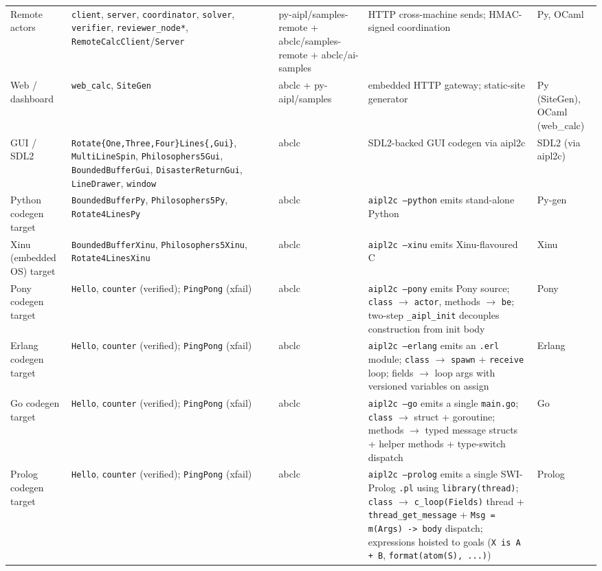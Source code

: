 \documentclass[10pt,a4paper,landscape]{article}
\begin{document}
\begin{longtable}{p{3.0cm} p{5.5cm} p{2.8cm} p{6.4cm} p{4.0cm}}
  Remote actors & \texttt{client}, \texttt{server}, \texttt{coordinator}, \texttt{solver}, \texttt{verifier}, \texttt{reviewer\_node*}, \texttt{RemoteCalcClient}/\texttt{Server} & py-aipl/samples-remote + abclc/samples-remote + abclc/ai-samples & HTTP cross-machine sends; HMAC-signed coordination & Py, OCaml \\
  Web / dashboard & \texttt{web\_calc}, \texttt{SiteGen} & abclc + py-aipl/samples & embedded HTTP gateway; static-site generator & Py (SiteGen), OCaml (web\_calc) \\
  GUI / SDL2 & \texttt{Rotate\{One,Three,Four\}Lines\{,Gui\}}, \texttt{MultiLineSpin}, \texttt{Philosophers5Gui}, \texttt{BoundedBufferGui}, \texttt{DisasterReturnGui}, \texttt{LineDrawer}, \texttt{window} & abclc & SDL2-backed GUI codegen via aipl2c & SDL2 (via aipl2c) \\
  Python codegen target & \texttt{BoundedBufferPy}, \texttt{Philosophers5Py}, \texttt{Rotate4LinesPy} & abclc & \texttt{aipl2c --python} emits stand-alone Python & Py-gen \\
  Xinu (embedded OS) target & \texttt{BoundedBufferXinu}, \texttt{Philosophers5Xinu}, \texttt{Rotate4LinesXinu} & abclc & \texttt{aipl2c --xinu} emits Xinu-flavoured C & Xinu \\
  Pony codegen target & \texttt{Hello}, \texttt{counter} (verified); \texttt{PingPong} (xfail) & abclc & \texttt{aipl2c --pony} emits Pony source; \texttt{class} $\to$ \texttt{actor}, methods $\to$ \texttt{be}; two-step \texttt{\_aipl\_init} decouples construction from init body & Pony \\
  Erlang codegen target & \texttt{Hello}, \texttt{counter} (verified); \texttt{PingPong} (xfail) & abclc & \texttt{aipl2c --erlang} emits an \texttt{.erl} module; \texttt{class} $\to$ \texttt{spawn} + \texttt{receive} loop; fields $\to$ loop args with versioned variables on assign & Erlang \\
  Go codegen target & \texttt{Hello}, \texttt{counter} (verified); \texttt{PingPong} (xfail) & abclc & \texttt{aipl2c --go} emits a single \texttt{main.go}; \texttt{class} $\to$ struct + goroutine; methods $\to$ typed message structs + helper methods + type-switch dispatch & Go \\
  Prolog codegen target & \texttt{Hello}, \texttt{counter} (verified); \texttt{PingPong} (xfail) & abclc & \texttt{aipl2c --prolog} emits a single SWI-Prolog \texttt{.pl} using \texttt{library(thread)}; \texttt{class} $\to$ \texttt{c\_loop(Fields)} thread + \texttt{thread\_get\_message} + \texttt{Msg = m(Args) -> body} dispatch; expressions hoisted to goals (\texttt{X is A + B}, \texttt{format(atom(S), ...)}) & Prolog \\

\end{longtable}
\end{document}
